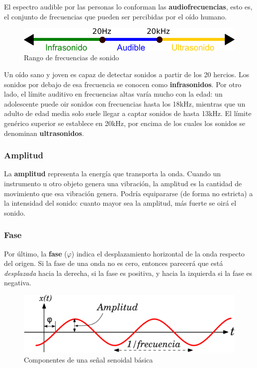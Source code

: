 El espectro audible por las personas lo conforman las
\textbf{audiofrecuencias}, esto es, el conjunto de frecuencias que
pueden ser percibidas por el oído humano. 

\begin{figure}[h]
  \centering
  \includegraphics[scale=0.8]{3_investigacion/imagen_rango_frecuencias}
  \caption{Rango de frecuencias de sonido}
\end{figure}


Un oído sano y joven es capaz de detectar sonidos a partir de los 20
hercios. Los sonidos por debajo de esa frecuencia se conocen como
\textbf{infrasonidos}. Por otro lado, el límite auditivo en
frecuencias altas varía mucho con la edad: un adolescente puede oir
sonidos con frecuencias hasta los 18kHz, mientras que un adulto de
edad media solo suele llegar a captar sonidos de hasta 13kHz. El
límite genérico superior se establece en 20kHz, por encima de los
cuales los sonidos se denominan \textbf{ultrasonidos}.


\subsubsection{Amplitud}
La \textbf{amplitud} representa la energía que transporta la
onda. Cuando un instrumento u otro objeto genera una vibración, la
amplitud es la cantidad de movimiento que esa vibración genera.
Podría equipararse (de forma no estricta) a la intensidad del sonido:
cuanto mayor sea la amplitud, más fuerte se oirá el sonido.

\subsubsection{Fase}
Por último, la \textbf{fase} ($\varphi$) indica el desplazamiento
horizontal de la onda respecto del origen. Si la fase de una onda no
es cero, entonces parecerá que está \textit{desplazada} hacia la
derecha, si la fase es positiva, y hacia la izquierda si la fase es
negativa.
\begin{figure}[h]\centering
    \includegraphics[scale=0.7]{3_investigacion/imagen_onda}
    \caption{Componentes de una señal senoidal básica}
\end{figure}
